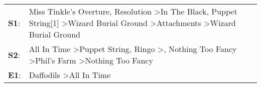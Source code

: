 \begin{supertabular}{p{0.03\textwidth}p{0.92\textwidth}}
 \textbf{S1}:  &  Miss Tinkle's Overture\textsuperscript{}, \enspace Resolution\textsuperscript{} \textgreater \enspace In The Black\textsuperscript{}, \enspace Puppet String[1]\textsuperscript{} \textgreater \enspace Wizard Burial Ground\textsuperscript{} \textgreater \enspace Attachments\textsuperscript{} \textgreater \enspace Wizard Burial Ground\textsuperscript{}  \enspace  \\
 \textbf{S2}:  &                                   All In Time\textsuperscript{} \textgreater \enspace Puppet String\textsuperscript{}, \enspace Ringo\textsuperscript{} \textgreater {}\textsuperscript{}, \enspace Nothing Too Fancy\textsuperscript{} \textgreater \enspace Phil's Farm\textsuperscript{} \textgreater \enspace Nothing Too Fancy\textsuperscript{}  \enspace  \\
 \textbf{E1}:  &                                                                                                                                                                                                                                                                                  Daffodils\textsuperscript{} \textgreater \enspace All In Time\textsuperscript{}  \enspace  \\
\end{supertabular}
